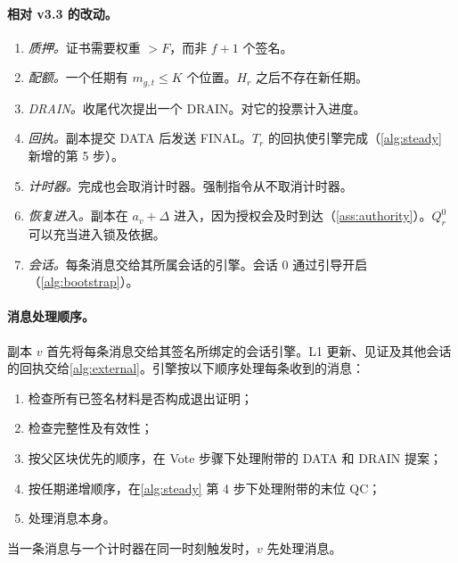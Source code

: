 \documentclass[11pt,a4paper]{article}
\newcommand{\RR}[1]{{\color{rrRed}#1}}
\begin{document}
\paragraph{相对 v3.3 的改动。}
\begin{enumerate}[label=\arabic*.]
\item \emph{质押。}证书需要权重 $>F$，而非 $f+1$ 个签名。
\item \emph{配额。}一个任期有 $m_{g,t}\le K$ 个位置。$H_r$ 之后不存在新任期。
\item \emph{DRAIN。}收尾代次提出一个 DRAIN。对它的投票计入进度。
\item \emph{回执。}副本提交 DATA 后发送 FINAL。$T_r$ 的回执使引擎完成（\cref{alg:steady} 新增的第 5 步）。
\item \emph{计时器。}完成也会取消计时器。强制指令从不取消计时器。
\item \emph{恢复进入。}副本在 $a_v+\Delta$ 进入，因为授权会及时到达（\cref{ass:authority}）。$Q_r^0$ 可以充当进入锁及依据。
\item \emph{会话。}每条消息交给其所属会话的引擎。会话 $0$ 通过引导开启（\cref{alg:bootstrap}）。
\end{enumerate}

\paragraph{消息处理顺序。}\leavevmode
\RR{副本 $v$ 首先将每条消息交给其签名所绑定的会话引擎。L1 更新、见证及其他会话的回执交给\cref{alg:external}。}引擎按以下顺序处理每条收到的消息：
\begin{enumerate}[label=(\arabic*)]
\item 检查所有已签名材料是否构成退出证明；
\item 检查完整性及有效性；
\item 按父区块优先的顺序，在 Vote 步骤下处理附带的 DATA \RR{和 DRAIN} 提案；
\item 按任期递增顺序，在\cref{alg:steady} 第 4 步下处理附带的末位 QC；
\item 处理消息本身。
\end{enumerate}
当一条消息与一个计时器在同一时刻触发时，$v$ 先处理消息。
\end{document}

